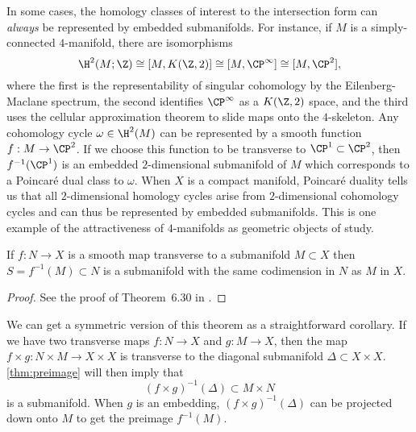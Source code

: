 \begin{remark}\label{rmk:homology-dimension-4-embedding}
	In some cases, the homology classes of interest to the intersection form can \emph{always} be represented by embedded submanifolds. For instance, if $M$ is a simply-connected $4$-manifold, there are isomorphisms
	\begin{equation}
		\H^2(M; \Z) \cong [M, K(\Z,2)] \cong [M, \CP^\infty] \cong [M,\CP^2],
	\end{equation}
	where the first is the representability of singular cohomology by the Eilenberg-Maclane spectrum, the second identifies $\CP^\infty$ as a $K(\Z,2)$ space, and the third uses the cellular approximation theorem to slide maps onto the $4$-skeleton. Any cohomology cycle $\omega\in \H^2(M)$ can be represented by a smooth function $f : M \to \CP^2$. If we choose this function to be transverse to $\CP^1\subset \CP^2$, then $f^{-1}(\CP^1)$ is an embedded $2$-dimensional submanifold of $M$ which corresponds to a Poincar\'e dual class to $\omega$. When $X$ is a compact manifold, Poincar\'e duality tells us that all $2$-dimensional homology cycles arise from $2$-dimensional cohomology cycles and can thus be represented by embedded submanifolds. This is one example of the attractiveness of $4$-manifolds as geometric objects of study.
\end{remark}


\begin{theorem}\label{thm:preimage}
	If $f : N \to X$ is a smooth map transverse to a submanifold $M\subset X$ then $S=f^{-1}(M)\subset N$ is a submanifold with the same codimension in $N$ as $M$ in $X$.
\end{theorem}
\begin{proof}
	See the proof of Theorem~6.30 in \cite{lee2013smooth}.
\end{proof}

\begin{remark}\label{rmk:symmetric-preimage-theorem}
	We can get a symmetric version of this theorem as a straightforward corollary. If we have two transverse maps $f : N\to X$ and $g : M\to X$, then the map $f\times g : N\times M \to X\times X$ is transverse to the diagonal submanifold $\Delta\subset X\times X$. \cref{thm:preimage} will then imply that
	\[
		(f\times g)^{-1}(\Delta) \subset M\times N
	\]
	is a submanifold. When $g$ is an embedding, $(f\times g)^{-1}(\Delta)$ can be projected down onto $M$ to get the preimage $f^{-1}(M)$.
\end{remark}

